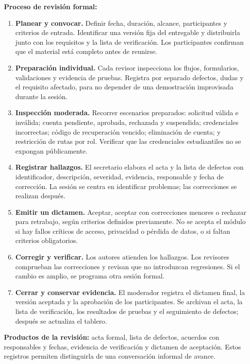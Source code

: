 \documentclass[11pt,letterpaper]{article}
\begin{document}
\textbf{Proceso de revisión formal:}
\begin{enumerate}
\item \textbf{Planear y convocar.} Definir fecha, duración, alcance,
participantes y criterios de entrada. Identificar una versión fija del
entregable y distribuirla junto con los requisitos y la lista de verificación.
Los participantes confirman que el material está completo antes de reunirse.
\item \textbf{Preparación individual.} Cada revisor inspecciona los flujos,
formularios, validaciones y evidencia de pruebas. Registra por separado
defectos, dudas y el requisito afectado, para no depender de una demostración
improvisada durante la sesión.
\item \textbf{Inspección moderada.} Recorrer escenarios preparados: solicitud
válida e inválida; cuenta pendiente, aprobada, rechazada y suspendida;
credenciales incorrectas; código de recuperación vencido; eliminación de
cuenta; y restricción de rutas por rol. Verificar que las credenciales
estudiantiles no se expongan públicamente.
\item \textbf{Registrar hallazgos.} El secretario elabora el acta y la lista
de defectos con identificador, descripción, severidad, evidencia,
responsable y fecha de corrección. La sesión se centra en identificar
problemas; las correcciones se realizan después.
\item \textbf{Emitir un dictamen.} Aceptar, aceptar con correcciones menores
o rechazar para retrabajo, según criterios definidos previamente. No se
acepta el módulo si hay fallos críticos de acceso, privacidad o pérdida de
datos, o si faltan criterios obligatorios.
\item \textbf{Corregir y verificar.} Los autores atienden los hallazgos.
Los revisores comprueban las correcciones y revisan que no introduzcan
regresiones. Si el cambio es amplio, se programa otra sesión formal.
\item \textbf{Cerrar y conservar evidencia.} El moderador registra el
dictamen final, la versión aceptada y la aprobación de los participantes.
Se archivan el acta, la lista de verificación, los resultados de pruebas
y el seguimiento de defectos; después se actualiza el tablero.
\end{enumerate}

\textbf{Productos de la revisión:} acta formal, lista de defectos, acuerdos
con responsables y fechas, evidencia de verificación y dictamen de aceptación.
Estos registros permiten distinguirla de una conversación informal de avance.
\end{document}
